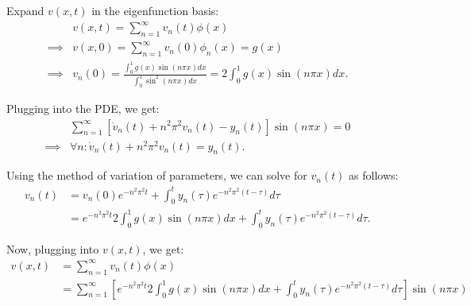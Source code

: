 \documentclass{article}
\begin{document}
Expand $v(x,t)$ in the eigenfunction basis:
\begin{align*}
  &v(x,t) = \sum_{n=1}^{\infty} v_n(t) \phi(x) &&\\
  \implies& v(x, 0) = \sum_{n=1}^{\infty} v_n(0) \phi_n(x) = g(x) &&\\
  \implies& v_n(0) = \frac{\int_{0}^{1} g(x) \sin(n \pi x) dx}{\int_{0}^{1} \sin^2(n \pi x) dx} 
  = 2 \int_{0}^{1} g(x) \sin(n \pi x) dx.
\end{align*}

Plugging into the PDE, we get:
\begin{align*}
  &\sum_{n=1}^{\infty} 
  \left[
    \dot{v}_n(t) + n^2 \pi^2 v_n(t) - y_n(t)
  \right] 
  \sin(n \pi x) = 0 &&\\
  \implies& \forall n: \dot{v}_n(t) + n^2 \pi^2 v_n(t) = y_n(t).
\end{align*}

Using the method of variation of parameters, we can solve for $v_n(t)$ as follows:
\begin{align*}
  v_n(t) 
  &= v_n(0) e^{- n^2 \pi ^2 t}
  + \int_{0}^{t} y_n(\tau) e^{-n^2 \pi^2 (t - \tau)} d\tau &&\\
  &= e^{- n^2 \pi ^2 t} 2 \int_{0}^{1} g(x) \sin(n \pi x) dx 
  + \int_{0}^{t} y_n(\tau) e^{-n^2 \pi^2 (t - \tau)} d\tau.
\end{align*}

Now, plugging into $v(x,t)$, we get:
\begin{align*}
  v(x,t) 
  &= \sum_{n=1}^{\infty} v_n(t) \phi(x) &&\\
  &=
  \sum_{n=1}^{\infty}
  \left[
    e^{- n^2 \pi ^2 t} 2 \int_{0}^{1} g(x) \sin(n \pi x) dx 
  + \int_{0}^{t} y_n(\tau) e^{-n^2 \pi^2 (t - \tau)} d\tau
  \right]
  \sin(n \pi x)
\end{align*}
\end{document}
